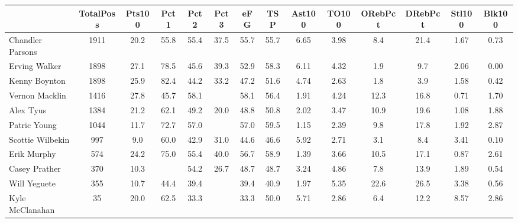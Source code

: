 \documentclass[10pt,letterpaper]{article}
\begin{document}
\begin{table}[ht]
\begin{center}
\begin{tabular}{lccccccccccccc}
  \hline
 & TotalPoss & Pts100 & Pct1 & Pct2 & Pct3 & eFG & TSP & Ast100 & TO100 & ORebPct & DRebPct & Stl100 & Blk100 \\ 
  \hline
Chandler Parsons & 1911 & 20.2 & 55.8 & 55.4 & 37.5 & 55.7 & 55.7 & 6.65 & 3.98 & 8.4 & 21.4 & 1.67 & 0.73 \\ 
  Erving Walker & 1898 & 27.1 & 78.5 & 45.6 & 39.3 & 52.9 & 58.3 & 6.11 & 4.32 & 1.9 & 9.7 & 2.06 & 0.00 \\ 
  Kenny Boynton & 1898 & 25.9 & 82.4 & 44.2 & 33.2 & 47.2 & 51.6 & 4.74 & 2.63 & 1.8 & 3.9 & 1.58 & 0.42 \\ 
  Vernon Macklin & 1416 & 27.8 & 45.7 & 58.1 &  & 58.1 & 56.4 & 1.91 & 4.24 & 12.3 & 16.8 & 0.71 & 1.70 \\ 
  Alex Tyus & 1384 & 21.2 & 62.1 & 49.2 & 20.0 & 48.8 & 50.8 & 2.02 & 3.47 & 10.9 & 19.6 & 1.08 & 1.88 \\ 
  Patric Young & 1044 & 11.7 & 72.7 & 57.0 &  & 57.0 & 59.5 & 1.15 & 2.39 & 9.8 & 17.8 & 1.92 & 2.87 \\ 
  Scottie Wilbekin & 997 & 9.0 & 60.0 & 42.9 & 31.0 & 44.6 & 46.6 & 5.92 & 2.71 & 3.1 & 8.4 & 3.41 & 0.10 \\ 
  Erik Murphy & 574 & 24.2 & 75.0 & 55.4 & 40.0 & 56.7 & 58.9 & 1.39 & 3.66 & 10.5 & 17.1 & 0.87 & 2.61 \\ 
  Casey Prather & 370 & 10.3 &  & 54.2 & 26.7 & 48.7 & 48.7 & 3.24 & 4.86 & 7.8 & 13.9 & 1.89 & 0.54 \\ 
  Will Yeguete & 355 & 10.7 & 44.4 & 39.4 &  & 39.4 & 40.9 & 1.97 & 5.35 & 22.6 & 26.5 & 3.38 & 0.56 \\ 
  Kyle McClanahan & 35 & 20.0 & 62.5 & 33.3 &  & 33.3 & 50.0 & 5.71 & 2.86 & 6.4 & 12.2 & 8.57 & 2.86 \\ 
   \hline
\end{tabular}
\end{center}
\end{table}
\end{document}

